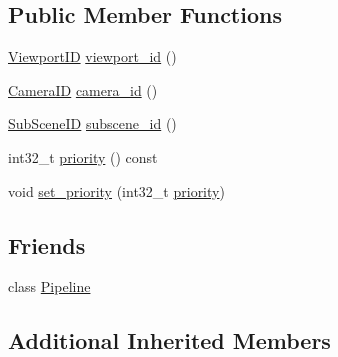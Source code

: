 \subsection*{Public Member Functions}
\begin{DoxyCompactItemize}
\item 
\hyperlink{namespacekglt_a24d24e429365d0832e56b0082d8e53a0}{Viewport\-I\-D} \hyperlink{classkglt_1_1_stage_a1ffaabe3e80af0b88d28d76e1c8ddd83}{viewport\-\_\-id} ()
\item 
\hyperlink{namespacekglt_a2a2b79f136b052b58ec737bd9c885429}{Camera\-I\-D} \hyperlink{classkglt_1_1_stage_afc2cacdc2d40a9dea2c000c762d864ee}{camera\-\_\-id} ()
\item 
\hyperlink{namespacekglt_a36b738e02745f47c81d1c9991fdc6237}{Sub\-Scene\-I\-D} \hyperlink{classkglt_1_1_stage_abeae94c8a86166e83ec6236404f69e22}{subscene\-\_\-id} ()
\item 
int32\-\_\-t \hyperlink{classkglt_1_1_stage_a9744a83a2d259f6d834456a930df9435}{priority} () const 
\item 
void \hyperlink{classkglt_1_1_stage_aa09be2806091a7dc704caf306468191e}{set\-\_\-priority} (int32\-\_\-t \hyperlink{classkglt_1_1_stage_a9744a83a2d259f6d834456a930df9435}{priority})
\end{DoxyCompactItemize}
\subsection*{Friends}
\begin{DoxyCompactItemize}
\item 
class \hyperlink{classkglt_1_1_stage_af9f0f1adbd5baee7830839447205af8d}{Pipeline}
\end{DoxyCompactItemize}
\subsection*{Additional Inherited Members}


